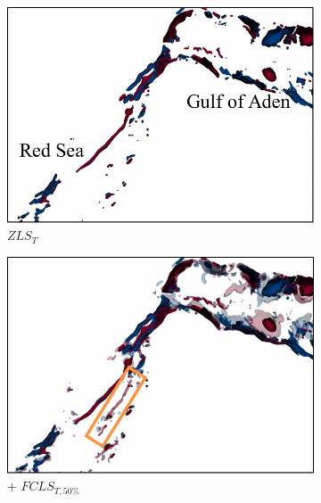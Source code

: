\begin{figure}[!h]
\begin{subfigure}{0.245\linewidth}
\centering
\includegraphics[width=\linewidth]{Images/RedSeaEddy/zls.pdf}
\vspace{-2mm}
\caption{$ZLS_{T}$}
\label{fig:rse_zls}
\end{subfigure}
\begin{subfigure}{0.245\linewidth}
\centering
\includegraphics[width=\linewidth]{Images/RedSeaEddy/fcls_50.pdf}
\vspace{-2mm}
\caption{+ $FCLS_{T,50\%}$}
\label{fig:rse_fls}
\end{subfigure}
\begin{subfigure}{0.245\linewidth}
\centering

\end{subfigure}
\end{figure}
